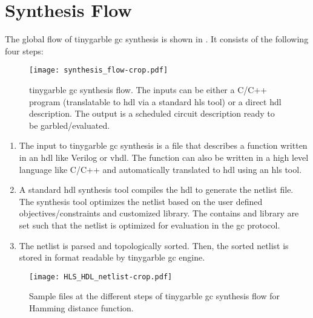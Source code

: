 \section{Synthesis Flow}\label{sec:syn-flow}
The global flow of \gls{tinygarble} \acrshort{gc} synthesis is shown in .
It consists of the following four steps:

\begin{figure}[ht]
\centering
\texttt{[image: synthesis\_flow-crop.pdf]}
\caption{\gls{tinygarble} \acrshort{gc} synthesis flow.
  The inputs can be either a C/C++ program (translatable to \acrshort{hdl} via a standard \acrshort{hls} tool) or a direct \acrshort{hdl} description.
  The output is a scheduled circuit description ready to be garbled/evaluated.}
\label{fig:synthesis-flow}
\end{figure}

\begin{enumerate}
\item The input to \gls{tinygarble} \acrshort{gc} synthesis is a file that describes a function written in an \acrshort{hdl} like Verilog or \acrshort{vhdl}.
      The function can also be written in a high level language like C/C++ and automatically translated to \acrshort{hdl} using an \acrshort{hls} tool.

\item A standard \acrshort{hdl} synthesis tool compiles the \acrshort{hdl} to generate the netlist file.
      The synthesis tool optimizes the netlist based on the user defined objectives/constraints and customized library.
      The contains and library are set such that the netlist is optimized for evaluation in the \acrshort{gc} protocol.

\item The netlist is parsed and topologically sorted.
      Then, the sorted netlist is stored in format readable by \gls{tinygarble} \acrshort{gc} engine.
\end{enumerate}

\begin{figure}[ht]
\centering
\texttt{[image: HLS\_HDL\_netlist-crop.pdf]}
\caption{Sample files at the different steps of \gls{tinygarble} \acrshort{gc} synthesis flow for Hamming distance function.}
\label{fig:globalflow_sample}
\end{figure}

